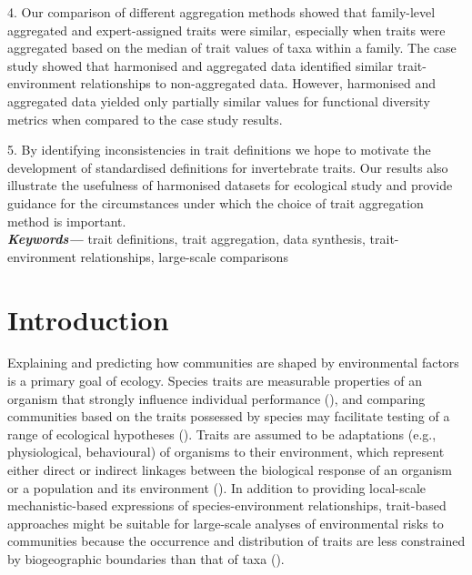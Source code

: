 \documentclass[12pt]{article}
\providecommand{\keywords}[1]
{
  {\small	
  \textbf{\textit{Keywords---}} #1
}}
\begin{document}
4. Our comparison of different aggregation methods showed that family-level aggregated and expert-assigned traits were similar, especially when traits were aggregated based on the median of trait values of taxa within a family.
The case study showed that harmonised and aggregated data identified similar trait-environment relationships to non-aggregated data. However, harmonised and aggregated data yielded only partially similar values for functional diversity metrics when compared to the case study results.

5. By identifying inconsistencies in trait definitions we hope to motivate the development of standardised definitions for invertebrate traits. Our results also illustrate the usefulness of harmonised datasets for ecological study and provide guidance for the circumstances under which the choice of trait aggregation method is important.
\\
\keywords{trait definitions, trait aggregation, data synthesis, trait-environment relationships, large-scale comparisons}


\newpage

\section*{Introduction}

Explaining and predicting how communities are shaped by environmental factors is a primary goal of ecology. Species traits are measurable properties of an organism that strongly influence individual performance (\cite{mcgill_rebuilding_2006}), and comparing communities based on the traits possessed by species may facilitate testing of a range of ecological hypotheses (\cite{statzner_perspectives_2001}). Traits are assumed to be adaptations (e.g., physiological, behavioural) of organisms to their environment, which represent either direct or indirect linkages between the biological response of an organism or a population and its environment (\cite{southwood_habitat_1977, verberk_delivering_2013}). In addition to providing local-scale mechanistic-based expressions of species-environment relationships, trait-based approaches might be suitable for large-scale analyses of environmental risks to communities because the occurrence and distribution of traits are less constrained by biogeographic boundaries than that of taxa (\cite{baird_toward_2011, bonada_taxonomic_2007}). 
\end{document}
